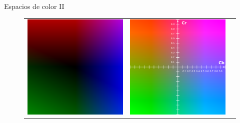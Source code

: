 \documentclass[11pt]{beamer}
\begin{document}
\begin{frame}{Espacios de color II}
            \begin{figure}[h!]
                \centering
                \footnotesize
                \begin{tabular}{ccc}
                    \includegraphics[height=0.25\textheight,keepaspectratio]{imagenes/YCbCr_Y0.png} & \includegraphics[height=0.25\textheight,keepaspectratio]{imagenes/YCbCr_Y50.png} &

\end{tabular}
\end{figure}
\end{frame}
\end{document}
